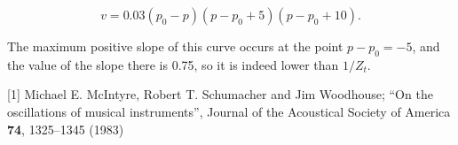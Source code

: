   $$v=0.03(p_0 -p)(p-p_0+5)(p-p_0+10) . \tag{11}$$ 

  The maximum positive slope of this curve occurs at the point $p-p_0=-5$, and 
  the value of the slope there is 0.75, so it is indeed lower than $1/Z_t$. 

  \sectionreferences{}[1] Michael E. McIntyre, Robert T. Schumacher and Jim 
  Woodhouse; ``On the oscillations of musical instruments'', Journal of the 
  Acoustical Society of America \textbf{74}, 1325--1345 (1983) 
